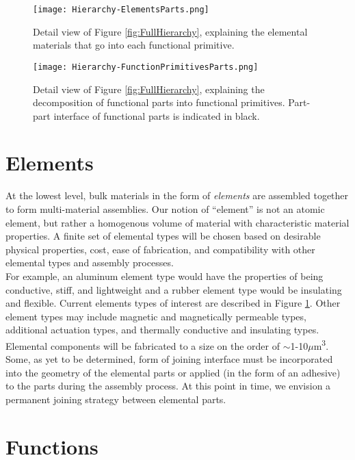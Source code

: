 {\begin{figure}
  \texttt{[image: Hierarchy-ElementsParts.png]}
  \caption{Detail view of Figure \ref{fig:FullHierarchy}, explaining the elemental materials that go into each functional primitive.}
  \label{fig:Hierarchy-ElementsParts}
\end{figure}

\begin{figure}
  \texttt{[image: Hierarchy-FunctionPrimitivesParts.png]}
  \caption{Detail view of Figure \ref{fig:FullHierarchy}, explaining the decomposition of functional parts into functional primitives.  Part-part interface of functional parts is indicated in black.}
  \label{fig:Hierarchy-FunctionPrimitivesParts}
\end{figure}

\section{Elements}\label{sec:elements}

At the lowest level, bulk materials in the form of \textit{elements} are assembled together to form multi-material assemblies.  Our notion of ``element'' is not an atomic element, but rather a homogenous volume of material with characteristic material properties.  A finite set of elemental types will be chosen based on desirable physical properties, cost, ease of fabrication, and compatibility with other elemental types and assembly processes.\\

For example, an aluminum element type would have the properties of being conductive, stiff, and lightweight and a rubber element type would be insulating and flexible.  Current elements types of interest are described in Figure \ref{fig:Hierarchy-ElementsParts}.  Other element types may include magnetic and magnetically permeable types, additional actuation types, and thermally conductive and insulating types.\\

Elemental components will be fabricated to a size on the order of $\sim$1-10$\mu$m\textsuperscript{3}.  Some, as yet to be determined, form of joining interface must be incorporated into the geometry of the elemental parts or applied (in the form of an adhesive) to the parts during the assembly process.  At this point in time, we envision a permanent joining strategy between elemental parts.

\section{Functions}

}
